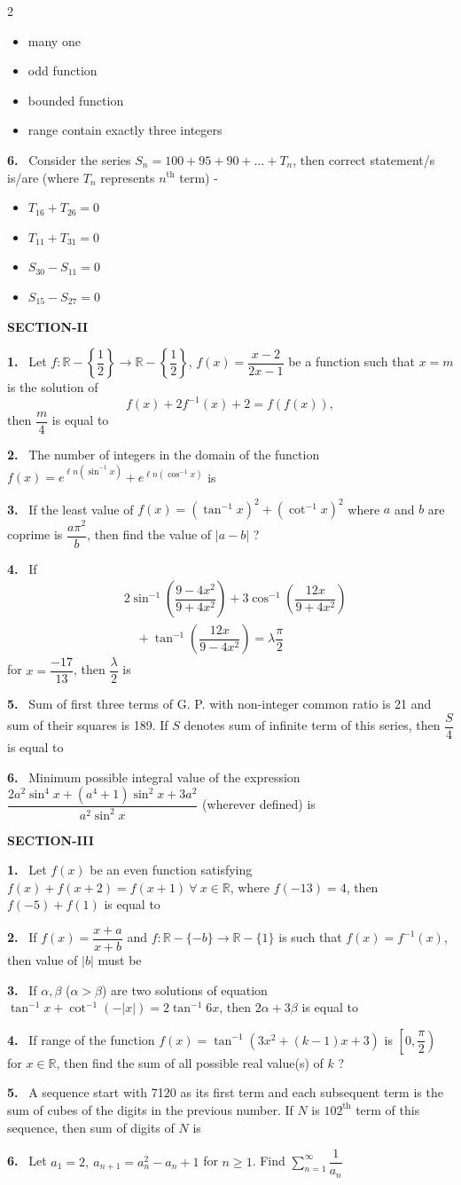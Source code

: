 \documentclass[10pt]{extarticle}
\newcommand{\sect}[1]{\par\smallskip\noindent\textbf{#1}\par}
\newcommand{\qn}[1]{\par\smallskip\noindent\textbf{#1.}~}
\newenvironment{qoptions}{\begin{itemize}[leftmargin=1.8em,itemsep=1pt,topsep=2pt,label={}]}{\end{itemize}}
\newcommand{\opt}[2]{\item[(#1)] #2}
\begin{document}
\begin{multicols}{2}
\begin{qoptions}
\opt{A}{many one}
\opt{B}{odd function}
\opt{C}{bounded function}
\opt{D}{range contain exactly three integers}
\end{qoptions}
\qn{6} Consider the series $S_n=100+95+90+\ldots+T_n$, then correct statement/s is/are (where $T_n$ represents $n^{\mathrm{th}}$ term) -
\begin{qoptions}
\opt{A}{$T_{16}+T_{26}=0$}
\opt{B}{$T_{11}+T_{31}=0$}
\opt{C}{$S_{30}-S_{11}=0$}
\opt{D}{$S_{15}-S_{27}=0$}
\end{qoptions}
\sect{SECTION-II}
\qn{1} Let $f:\mathbb R-\left\{\dfrac12\right\}\to\mathbb R-\left\{\dfrac12\right\}$, $f(x)=\dfrac{x-2}{2x-1}$ be a function such that $x=m$ is the solution of \[f(x)+2f^{-1}(x)+2=f(f(x)),\] then $\dfrac m4$ is equal to
\qn{2} The number of integers in the domain of the function $f(x)=e^{\ell n(\sin^{-1}x)}+e^{\ell n(\cos^{-1}x)}$ is
\qn{3} If the least value of $f(x)=(\tan^{-1}x)^2+(\cot^{-1}x)^2$ where $a$ and $b$ are coprime is $\dfrac{a\pi^2}b$, then find the value of $|a-b|$ ?
\qn{4} If \[\begin{aligned}&2\sin^{-1}\left(\dfrac{9-4x^2}{9+4x^2}\right)+3\cos^{-1}\left(\dfrac{12x}{9+4x^2}\right)\\&\quad+\tan^{-1}\left(\dfrac{12x}{9-4x^2}\right)=\lambda\dfrac\pi2\end{aligned}\] for $x=\dfrac{-17}{13}$, then $\dfrac\lambda2$ is
\qn{5} Sum of first three terms of G. P. with non-integer common ratio is 21 and sum of their squares is 189. If $S$ denotes sum of infinite term of this series, then $\dfrac S4$ is equal to
\qn{6} Minimum possible integral value of the expression $\dfrac{2a^2\sin^4x+(a^4+1)\sin^2x+3a^2}{a^2\sin^2x}$ (wherever defined) is
\columnbreak
\sect{SECTION-III}
\qn{1} Let $f(x)$ be an even function satisfying $f(x)+f(x+2)=f(x+1)\ \forall\ x\in\mathbb R$, where $f(-13)=4$, then $f(-5)+f(1)$ is equal to
\qn{2} If $f(x)=\dfrac{x+a}{x+b}$ and $f:\mathbb R-\{-b\}\to\mathbb R-\{1\}$ is such that $f(x)=f^{-1}(x)$, then value of $|b|$ must be
\qn{3} If $\alpha,\beta$ ($\alpha>\beta$) are two solutions of equation $\tan^{-1}x+\cot^{-1}(-|x|)=2\tan^{-1}6x$, then $2\alpha+3\beta$ is equal to
\qn{4} If range of the function $f(x)=\tan^{-1}(3x^2+(k-1)x+3)$ is $\left[0,\dfrac\pi2\right)$ for $x\in\mathbb R$, then find the sum of all possible real value(s) of $k$ ?
\qn{5} A sequence start with 7120 as its first term and each subsequent term is the sum of cubes of the digits in the previous number. If $N$ is $102^{\mathrm{th}}$ term of this sequence, then sum of digits of $N$ is
\qn{6} Let $a_1=2,\ a_{n+1}=a_n^2-a_n+1$ for $n\geq1$. Find $\displaystyle\sum_{n=1}^{\infty}\dfrac1{a_n}$
\end{multicols}
\end{document}
